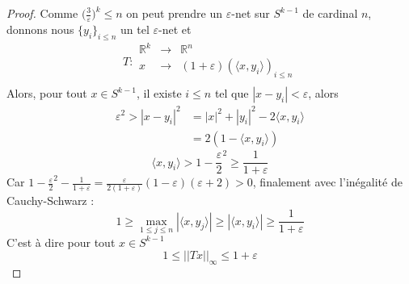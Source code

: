 \documentclass[12pt]{article}
\theoremstyle{definition}
\begin{document}
\begin{proof}
	Comme $\big(\frac{3}{\varepsilon}\big)^{k}\leq n$ on peut prendre un $\varepsilon$-net sur $S^{k-1}$ de cardinal $n$, donnons nous $\{y_i\}_{i\leq n}$ un tel $\varepsilon$-net et 
	\begin{equation*}
	T : \begin{array}{ccc}
	\mathbb{R}^k& \to &\mathbb{R}^n\\
	x & \to & (1+\varepsilon)(\langle x,y_i\rangle)_{i\leq n}\\
	\end{array}
	\end{equation*}
	Alors, pour tout $x\in S^{k-1}$, il existe $i\leq n$ tel que $|x-y_i|<\varepsilon$, alors 
	\begin{align*}
	\varepsilon^2>|x-y_i|^2&=|x|^2+|y_i|^2-2\langle x,y_i\rangle \\
	&=2(1-\langle x,y_i\rangle)
	\end{align*}
	\begin{equation*}
	\langle x,y_i\rangle >1 - \frac{\varepsilon}{2}^2 \geq \frac{1}{1+\varepsilon}
	\end{equation*}
	Car $1 - \frac{\varepsilon}{2}^2-\frac{1}{1+\varepsilon}=\frac{\varepsilon}{2(1+\varepsilon)}(1-\varepsilon)(\varepsilon+2)>0$, finalement avec l'inégalité de Cauchy-Schwarz : 
	\begin{equation*}
	1\geq  \max_{1\leq j \leq n}|\langle x,y_j\rangle| \geq  |\langle x,y_i\rangle| \geq \frac{1}{1+\varepsilon}
	\end{equation*}
	C'est à dire pour tout $x\in S^{k-1}$
	\begin{equation*}
	1\leq ||Tx||_\infty \leq 1+\varepsilon
	\end{equation*} 
\end{proof}
\appendix
\end{document}
